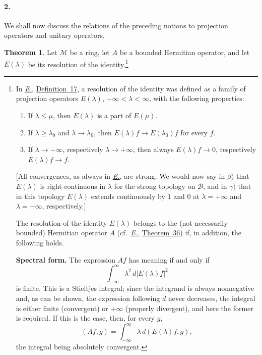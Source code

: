\documentclass[
  paper=b5,
  twoside=true,
  fontsize=13pt,
  headings=normal,
  bookmarkpackage=false
]{scrartcl}
\theoremstyle{definition}
\newtheorem{theorem}{Theorem}
\newcommand{\Eref}{\hyperref[fn:E-paper]{\emph{E.}}}
\newcommand{\ErefText}[1]{\href{https://doi.org/10.1007/BF01782338}{#1}}
\begin{document}
\paragraph*{2.}\label{sec:ring-and-commutant-2}
We shall now discuss the relations of the preceding notions to projection
operators and unitary operators.

\begingroup
{}
\begin{theorem}\label{thm:1}
Let \(\mathcal M\) be a ring, let \(A\) be a bounded Hermitian operator,
and let \(E(\lambda)\) be its resolution of the
identity.\footnote{\label{fn:42}In \Eref, \ErefText{Definition~17}, a resolution
of the identity was defined as a family of projection operators
\(E(\lambda)\), \(-\infty<\lambda<\infty\), with the following
properties:
\begin{enumerate}
  \item[\(\alpha)\)] If \(\lambda\leq\mu\), then \(E(\lambda)\) is a
  part of \(E(\mu)\).
  \item[\(\beta)\)] If \(\lambda\geq\lambda_0\) and
  \(\lambda\to\lambda_0\), then
  \(E(\lambda)f\to E(\lambda_0)f\) for every \(f\).
  \item[\(\gamma)\)] If \(\lambda\to-\infty\), respectively
  \(\lambda\to+\infty\), then always
  \(E(\lambda)f\to0\), respectively \(E(\lambda)f\to f\).
\end{enumerate}
[All convergences, as always in \Eref, are strong. We would now say in
\(\beta)\) that \(E(\lambda)\) is right-continuous in \(\lambda\) for
the strong topology on \(\mathcal B\), and in \(\gamma)\) that in this
topology \(E(\lambda)\) extends continuously by \(1\) and \(0\) at
\(\lambda=+\infty\) and \(\lambda=-\infty\), respectively.]

The resolution of the identity \(E(\lambda)\) belongs to the (not
necessarily bounded) Hermitian operator \(A\) (cf.\ \Eref, \ErefText{Theorem~36})
if, in addition, the following holds.

\medskip
\noindent\textbf{Spectral form.}
The expression \(Af\) has meaning if and only if
\[
  \int_{-\infty}^{\infty}
    \lambda^2\,d\lvert E(\lambda)f\rvert^2
\]
is finite.  This is a Stieltjes integral; since the integrand is always
nonnegative and, as can be shown, the expression following \(d\) never
decreases, the integral is either finite (convergent) or
\(+\infty\) (properly divergent), and here the former is required.  If
this is the case, then, for every \(g\),
\[
  (Af,g)=\int_{-\infty}^{\infty}
    \lambda\,d(E(\lambda)f,g),
\]
the integral being absolutely convergent.

}
\end{theorem}
\end{document}
